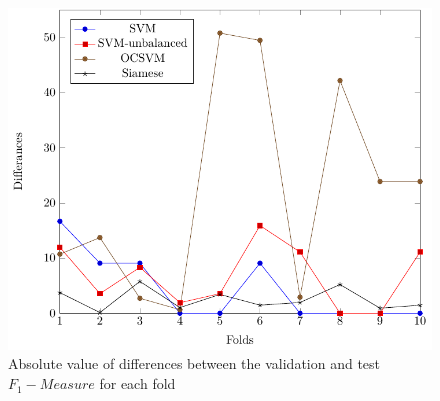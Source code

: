 \begin{figure}
	\includegraphics[width=\linewidth]{img/prai/diff_test_validation/diff_test_validation}
	\caption{Absolute value of differences between the validation and test $ F_1 -Measure$ for each fold}
	\label{fig:diff_test_validation}
\end{figure}
